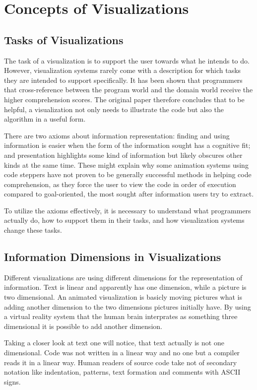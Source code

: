 \documentclass[11pt, a4paper, ngerman, twoside]{article}
\theoremstyle{plain}\newtheorem{Lemma}{Lemma}
\theoremstyle{plain}\newtheorem{Satz}[Lemma]{Satz}
\theoremstyle{definition}\newtheorem{Definition}[Lemma]{Definition}
\theoremstyle{definition}\newtheorem*{Beispiel}{Beispiel}
\theoremstyle{remark}\newtheorem*{Bemerkung}{Bemerkung}
\begin{document}
\section{Concepts of Visualizations}

\subsection{Tasks of Visualizations}

The task of a visualization is to support the user towards what he intends to do. However, visualization systems rarely come with a description for which tasks they are intended to support specifically. It has been shown that programmers that cross-reference between the program world and the domain world receive the higher comprehension scores\cite{penn}. The original paper therefore concludes that to be helpful, a visualization not only needs to illustrate the code but also the algorithm in a useful form.

There are two axioms about information representation: finding and using information is easier when the form of the information sought has a cognitive fit; and presentation highlights some kind of information but likely obscures other kinds at the same time. These might explain why some animation systems using code steppers have not proven to be generally successful methods in helping code comprehension, as they force the user to view the code in order of execution compared to goal-oriented, the most sought after information users try to extract.

To utilize the axioms effectively, it is necessary to understand what programmers actually do, how to support them in their tasks, and how visualization systems change these tasks.

\subsection{Information Dimensions in Visualizations}

Different visualizations are using different dimensions for the representation of information. Text is linear and apparently has one dimension, while a picture is two dimensional. An animated visualization is basicly moving pictures what is adding another dimension to the two dimensions pictures initially have. By using a virtual reality system that the human brain interprates as something three dimensional it is possible to add another dimension.

Taking a closer look at text one will notice, that text actually is not one dimensional. Code was not written in a linear way and no one but a compiler reads it in a linear way. Human readers of source code take not of secondary notation \cite{green} like indentation, patterns, text formation and comments with ASCII signs.
\end{document}
